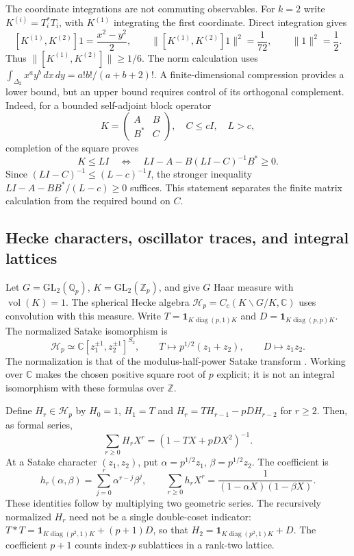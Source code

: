 The coordinate integrations are not commuting observables.  For $k=2$ write
$K^{(i)}=T_i^*T_i$, with $K^{(1)}$ integrating the first coordinate.
Direct integration gives
\[
 [K^{(1)},K^{(2)}]1=\frac{x^2-y^2}{2},\qquad
 \|[K^{(1)},K^{(2)}]1\|^2=\frac1{72},\qquad \|1\|^2=\frac12.
\]
Thus $\|[K^{(1)},K^{(2)}]\|\geq1/6$.
The norm calculation uses
$\int_{\Delta_2}x^ay^b\,dx\,dy=a!b!/(a+b+2)!$.
A finite-dimensional compression provides a lower bound, but an upper bound
requires control of its orthogonal complement.  Indeed, for a bounded
self-adjoint block operator
\[
 K=\begin{pmatrix}A&B\\B^*&C\end{pmatrix},\quad C\leq cI,\quad L>c,
\]
completion of the square proves
\[
 K\leq LI\quad\Longleftrightarrow\quad
 LI-A-B(LI-C)^{-1}B^*\geq0.
\]
Since $(LI-C)^{-1}\leq(L-c)^{-1}I$, the stronger inequality
$LI-A-BB^*/(L-c)\geq0$ suffices.  This statement separates the finite
matrix calculation from the required bound on $C$.

\subsection{Hecke characters, oscillator traces, and integral lattices}
\label{syn-arith:hecke}
Let $G=\mathrm{GL}_2(\mathbb Q_p)$, $K=\mathrm{GL}_2(\mathbb Z_p)$,
and give $G$ Haar measure with $\operatorname{vol}(K)=1$.
The spherical Hecke algebra $\mathcal H_p=C_c(K\backslash G/K,\mathbb C)$
uses convolution with this measure.  Write
$T=\mathbf1_{K\operatorname{diag}(p,1)K}$ and
$D=\mathbf1_{K\operatorname{diag}(p,p)K}$.
The normalized Satake isomorphism is
\[
 \mathcal H_p\simeq\mathbb C[z_1^{\pm1},z_2^{\pm1}]^{S_2},\qquad
 T\longmapsto p^{1/2}(z_1+z_2),\qquad D\longmapsto z_1z_2.
\]
The normalization is that of the modulus-half-power Satake transform
\cite[\S3, especially Proposition~3.6 and formula~(3.13)]{syn-arith:Gross}.
Working over $\mathbb C$ makes the chosen positive square root of $p$ explicit;
it is not an integral isomorphism with these formulas over $\mathbb Z$.

Define $H_r\in\mathcal H_p$ by $H_0=1$, $H_1=T$ and
$H_r=TH_{r-1}-pDH_{r-2}$ for $r\geq2$.
Then, as formal series,
\[
 \sum_{r\geq0}H_rX^r=(1-TX+pDX^2)^{-1}.
\]
At a Satake character $(z_1,z_2)$, put
$\alpha=p^{1/2}z_1$, $\beta=p^{1/2}z_2$.  The coefficient is
\[
 h_r(\alpha,\beta)=\sum_{j=0}^r\alpha^{r-j}\beta^j,
 \qquad \sum_{r\geq0}h_rX^r=\frac1{(1-\alpha X)(1-\beta X)}.
\]
These identities follow by multiplying two geometric series.
The recursively normalized $H_r$ need not be a single double-coset indicator:
$T*T=\mathbf1_{K\operatorname{diag}(p^2,1)K}+(p+1)D$, so that
$H_2=\mathbf1_{K\operatorname{diag}(p^2,1)K}+D$.
The coefficient $p+1$ counts index-$p$ sublattices in a rank-two lattice.

